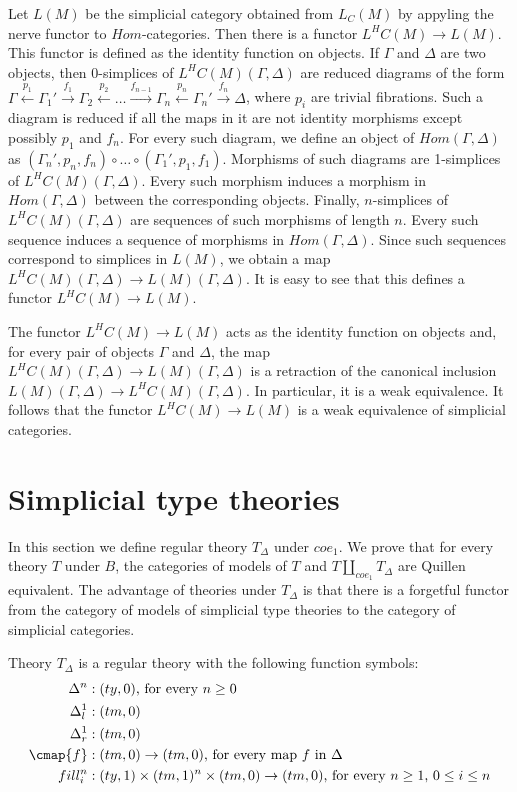 Let $L(M)$ be the simplicial category obtained from $L_C(M)$ by appyling the nerve functor to $Hom$-categories.
Then there is a functor $L^H C(M) \to L(M)$.
This functor is defined as the identity function on objects.
If $\Gamma$ and $\Delta$ are two objects, then 0-simplices of $L^H C(M)(\Gamma,\Delta)$ are reduced diagrams of the form
$\Gamma \xleftarrow{p_1} \Gamma_1' \xrightarrow{f_1} \Gamma_2 \xleftarrow{p_2} \ldots \xrightarrow{f_{n-1}} \Gamma_n \xleftarrow{p_n} \Gamma_n' \xrightarrow{f_n} \Delta$,
where $p_i$ are trivial fibrations.
Such a diagram is reduced if all the maps in it are not identity morphisms except possibly $p_1$ and $f_n$.
For every such diagram, we define an object of $Hom(\Gamma,\Delta)$ as $(\Gamma_n',p_n,f_n) \circ \ldots \circ (\Gamma_1',p_1,f_1)$.
Morphisms of such diagrams are 1-simplices of $L^H C(M)(\Gamma,\Delta)$.
Every such morphism induces a morphism in $Hom(\Gamma,\Delta)$ between the corresponding objects.
Finally, $n$-simplices of $L^H C(M)(\Gamma,\Delta)$ are sequences of such morphisms of length $n$.
Every such sequence induces a sequence of morphisms in $Hom(\Gamma,\Delta)$.
Since such sequences correspond to simplices in $L(M)$, we obtain a map $L^H C(M)(\Gamma,\Delta) \to L(M)(\Gamma,\Delta)$.
It is easy to see that this defines a functor $L^H C(M) \to L(M)$.

The functor $L^H C(M) \to L(M)$ acts as the identity function on objects and, for every pair of objects $\Gamma$ and $\Delta$,
the map $L^H C(M)(\Gamma,\Delta) \to L(M)(\Gamma,\Delta)$ is a retraction of the canonical inclusion $L(M)(\Gamma,\Delta) \to L^H C(M)(\Gamma,\Delta)$.
In particular, it is a weak equivalence.
It follows that the functor $L^H C(M) \to L(M)$ is a weak equivalence of simplicial categories.


\section{Simplicial type theories}

In this section we define regular theory $T_\Delta$ under $coe_1$.
We prove that for every theory $T$ under $B$, the categories of models of $T$ and $T \amalg_{coe_1} T_\Delta$ are Quillen equivalent.
The advantage of theories under $T_\Delta$ is that there is a forgetful functor from the category of models of simplicial type theories to the category of simplicial categories.

Theory $T_\Delta$ is a regular theory with the following function symbols:
\begin{align*}
\Delta^n & : (ty,0) \text{, for every } n \geq 0 \\
\Delta^1_l & : (tm,0) \\
\Delta^1_r & : (tm,0) \\
\cmap{f} & : (tm,0) \to (tm,0) \text{, for every map $f$ in $\Delta$} \\
fill^n_i & : (ty,1) \times (tm,1)^n \times (tm,0) \to (tm,0) \text{, for every } n \geq 1 \text{, } 0 \leq i \leq n
\end{align*}

